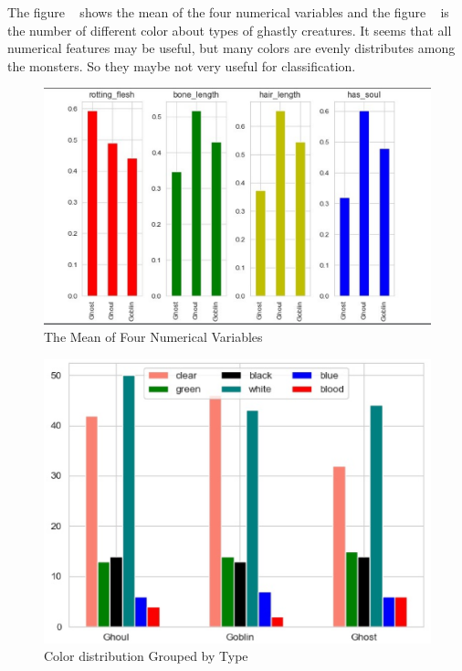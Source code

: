 The figure ~ 
shows the mean of the four numerical variables  
and the figure ~ 
is the number of different color 
about types of ghastly creatures.
It seems that all numerical features may be useful, 
but many colors are evenly distributes among the monsters. 
So they maybe not very useful for classification.


\begin{figure}[htbp]
	\centering
	
	\includegraphics[scale=0.3]{figures/his_1.eps}
	\caption{The Mean of Four Numerical Variables}\label{fig:his_1}
\end{figure}

\begin{figure}[htbp]
	\centering
	
	\includegraphics[scale=0.3]{figures/his_2.eps}
	\caption{Color distribution Grouped by Type}\label{fig:his_2}
\end{figure}

